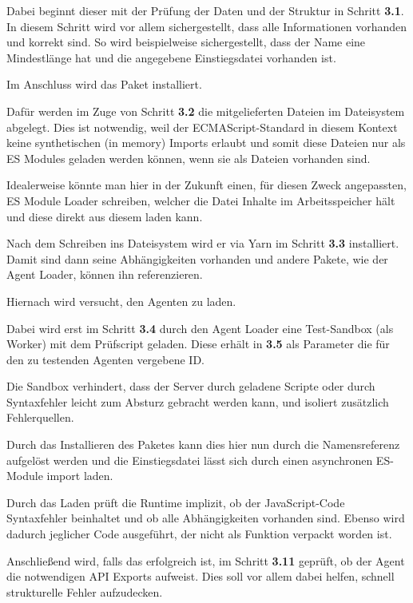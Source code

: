 
Dabei beginnt dieser mit der Prüfung der Daten und der Struktur in Schritt \textbf{3.1}.
In diesem Schritt wird vor allem sichergestellt, dass alle Informationen vorhanden und korrekt sind.
So wird beispielweise sichergestellt, dass der Name eine Mindestlänge hat und die angegebene Einstiegsdatei vorhanden ist.

Im Anschluss wird das Paket installiert.

Dafür werden im Zuge von Schritt \textbf{3.2} die mitgelieferten Dateien im Dateisystem abgelegt.
Dies ist notwendig, weil der ECMAScript-Standard in diesem Kontext keine synthetischen (in memory) Imports erlaubt und somit diese Dateien nur als ES Modules geladen werden können, wenn sie als Dateien vorhanden sind.

Idealerweise könnte man hier in der Zukunft einen, für diesen Zweck angepassten, ES Module Loader schreiben, welcher die Datei Inhalte im Arbeitsspeicher hält und diese direkt aus diesem laden kann.

Nach dem Schreiben ins Dateisystem wird er via Yarn im Schritt \textbf{3.3} installiert.
Damit sind dann seine Abhängigkeiten vorhanden und andere Pakete, wie der Agent Loader, können ihn referenzieren.

Hiernach wird versucht, den Agenten zu laden.

Dabei wird erst im Schritt \textbf{3.4} durch den Agent Loader eine Test-Sandbox (als Worker) mit dem Prüfscript geladen.
Diese erhält in \textbf{3.5} als Parameter die für den zu testenden Agenten vergebene ID.


Die Sandbox verhindert, dass der Server durch geladene Scripte oder durch Syntaxfehler leicht zum Absturz gebracht werden kann, und isoliert zusätzlich Fehlerquellen.

Durch das Installieren des Paketes kann dies hier nun durch die Namensreferenz aufgelöst werden und die Einstiegsdatei lässt sich durch einen asynchronen ES-Module import laden.

Durch das Laden prüft die Runtime implizit, ob der JavaScript-Code Syntaxfehler beinhaltet und ob alle Abhängigkeiten vorhanden sind.
Ebenso wird dadurch jeglicher Code ausgeführt, der nicht als Funktion verpackt worden ist.

Anschließend wird, falls das erfolgreich ist, im Schritt \textbf{3.11} geprüft, ob der Agent die notwendigen API Exports aufweist.
Dies soll vor allem dabei helfen, schnell strukturelle Fehler aufzudecken.

